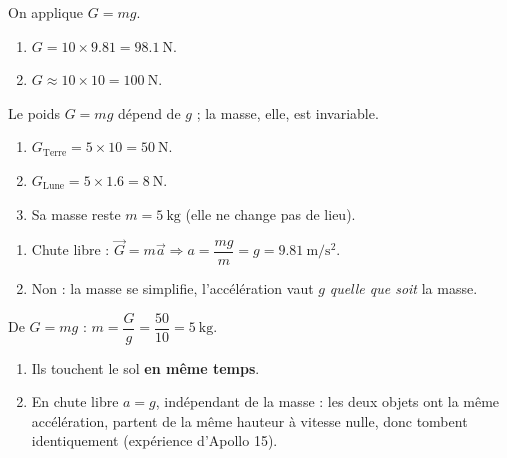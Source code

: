 \documentclass[11pt,a4paper]{article}
\newcommand{\vv}[1]{\vec{#1}}\newcommand{\ds}{\displaystyle}
\begin{document}

\begin{corrige}
On applique $G=mg$.
\begin{enumerate}[label=\alph*)]
  \item $G=10\times\num{9,81}=\qty{98,1}{\newton}$.
  \item $G\approx 10\times 10=\qty{100}{\newton}$.
\end{enumerate}
\end{corrige}

\begin{corrige}
Le poids $G=mg$ dépend de $g$ ; la masse, elle, est invariable.
\begin{enumerate}[label=\alph*)]
  \item $G_{\text{Terre}}=5\times 10=\qty{50}{\newton}$.
  \item $G_{\text{Lune}}=5\times\num{1,6}=\qty{8}{\newton}$.
  \item Sa masse reste $m=\qty{5}{\kilogram}$ (elle ne change pas de lieu).
\end{enumerate}
\end{corrige}

\begin{corrige}
\begin{enumerate}[label=\alph*)]
  \item Chute libre : $\vv G=m\vv a \Rightarrow a=\dfrac{mg}{m}=g=\qty{9,81}{\metre\per\second\squared}$.
  \item Non : la masse se simplifie, l'accélération vaut $g$ \emph{quelle que soit} la masse.
\end{enumerate}
\end{corrige}

\begin{corrige}
De $G=mg$ : $m=\dfrac{G}{g}=\dfrac{50}{10}=\qty{5}{\kilogram}$.
\end{corrige}

\begin{corrige}
\begin{enumerate}[label=\alph*)]
  \item Ils touchent le sol \textbf{en même temps}.
  \item En chute libre $a=g$, indépendant de la masse : les deux objets ont la même accélération,
        partent de la même hauteur à vitesse nulle, donc tombent identiquement (expérience d'Apollo 15).
\end{enumerate}
\end{corrige}
\end{document}
